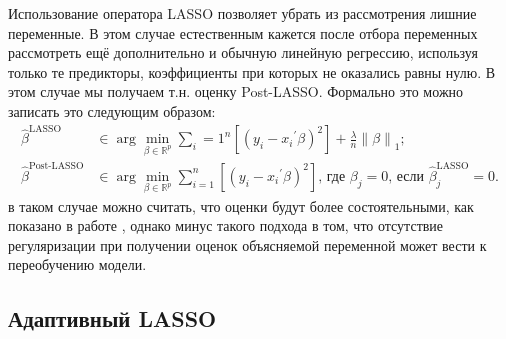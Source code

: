 Использование оператора LASSO позволяет убрать из рассмотрения лишние переменные. В этом случае естественным кажется после отбора переменных рассмотреть ещё дополнительно и обычную линейную регрессию, используя только те предикторы, коэффициенты при которых не оказались равны нулю. В этом случае мы получаем т.н. оценку Post-LASSO. Формально это можно записать это следующим образом:
\begin{align}
    \hat{\beta}^{\text{LASSO}} &\in \arg \min_{\beta \in
\mathbb{R}^p} \sum_i=1^n \left[ (y_i - {x_i}^{'} \beta)^2 \right] +  \frac{\lambda}{n} \left\lVert \beta \right\rVert_1; \\
  \hat{\beta}^{\text{Post-LASSO}} &\in \arg \min_{\beta \in
\mathbb{R}^p} \sum_{i=1}^n \left[ (y_i - {x_i}^{'} \beta)^2 \right] \text{,  где }  \beta_j = 0 \text{, если } \hat{\beta}^{\text{LASSO}}_j = 0.
\end{align}
в таком случае можно считать, что оценки будут более состоятельными, как показано в работе \cite{chernozhukov2015post}
, однако минус такого подхода в том, что отсутствие регуляризации при получении оценок объясняемой переменной может вести к переобучению модели.

\subsection{Адаптивный LASSO}

